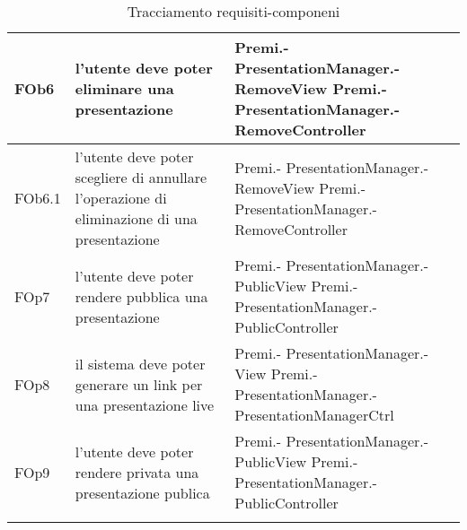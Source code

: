 \begin{longtable}{|l|p{5cm}|p{4cm}|}
\hline
FOb6 & l'utente deve poter eliminare una presentazione & Premi.- \linebreak PresentationManager.- \linebreak RemoveView \linebreak Premi.- \linebreak PresentationManager.- \linebreak RemoveController \linebreak \\
\hline
FOb6.1 & l'utente deve poter scegliere di annullare l'operazione di eliminazione di una presentazione & Premi.- \linebreak PresentationManager.- \linebreak RemoveView \linebreak Premi.- \linebreak PresentationManager.- \linebreak RemoveController \linebreak \\
\hline
FOp7 & l'utente deve poter rendere pubblica una presentazione & Premi.- \linebreak PresentationManager.- \linebreak PublicView \linebreak Premi.- \linebreak PresentationManager.- \linebreak PublicController \linebreak \\
\hline
FOp8 & il sistema deve poter generare un link per una presentazione live & Premi.- \linebreak PresentationManager.- \linebreak View \linebreak Premi.- \linebreak PresentationManager.- \linebreak PresentationManagerCtrl \linebreak \\
\hline
FOp9 & l'utente deve poter rendere privata una presentazione publica & Premi.- \linebreak PresentationManager.- \linebreak PublicView \linebreak Premi.- \linebreak PresentationManager.- \linebreak PublicController \linebreak \\
\hline
\caption{Tracciamento requisiti-componeni}
\end{longtable}